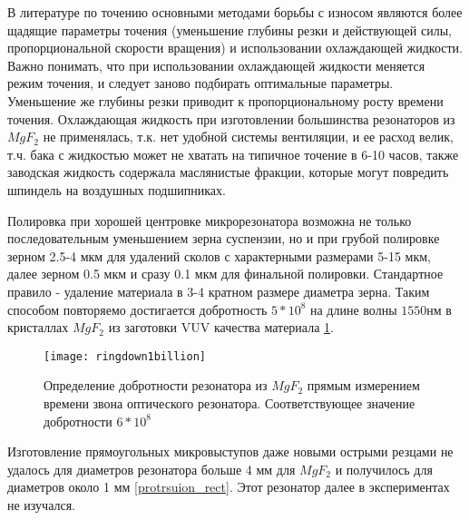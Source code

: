 
В литературе по точению основными методами борьбы с износом являются более щадящие параметры точения (уменьшение глубины резки и действующей силы, пропорциональной скорости вращения) и использовании охлаждающей жидкости. Важно понимать, что при использовании охлаждающей жидкости меняется режим точения, и следует заново подбирать оптимальные параметры. Уменьшение же глубины резки приводит к пропорциональному росту времени точения. Охлаждающая жидкость при изготовлении большинства резонаторов из $MgF_2$ не применялась, т.к. нет удобной системы вентиляции, и ее расход велик, т.ч. бака с жидкостью может не хватать на типичное точение в 6-10 часов, также заводская жидкость содержала маслянистые фракции, которые могут повредить шпиндель на воздушных подшипниках.

Полировка при хорошей центровке микрорезонатора возможна не только последовательным уменьшением зерна суспензии, но и при грубой полировке зерном 2.5-4 мкм для удалений сколов с характерными размерами 5-15 мкм, далее зерном 0.5 мкм и сразу 0.1 мкм для финальной полировки. Стандартное правило - удаление материала в 3-4 кратном размере диаметра зерна. Таким способом повторяемо достигается добротность $5*10^8$ на длине волны $1550 нм$ в кристаллах $MgF_2$ из заготовки VUV качества материала \ref{ringdown}.

\begin{figure}[ht]
\centering
  \texttt{[image: ringdown1billion]}
  \caption{Определение добротности резонатора из $MgF_2$ прямым измерением времени звона оптического резонатора. Соответствующее значение добротности $6*10^8$}
  \label{ringdown}
\end{figure}


Изготовление прямоугольных микровыступов даже новыми острыми резцами не удалось для диаметров резонатора больше 4 мм для $MgF_2$ и получилось для диаметров около 1 мм \ref{protrsuion_rect}. Этот резонатор далее в экспериментах не изучался.

